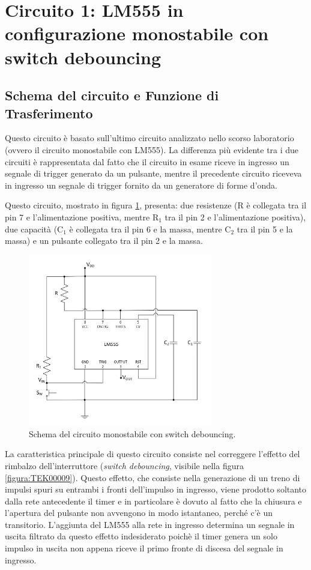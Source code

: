 \documentclass{report}
\begin{document}
\newpage
\section{Circuito 1: LM555 in configurazione monostabile con switch debouncing}
\subsection{Schema del circuito e Funzione di Trasferimento}
Questo circuito è basato sull'ultimo circuito analizzato nello scorso laboratorio (ovvero il circuito monostabile con LM555). La differenza più evidente tra i due circuiti è rappresentata dal fatto che il circuito in esame riceve in ingresso un segnale di trigger generato da un pulsante, mentre il precedente circuito riceveva in ingresso un segnale di trigger fornito da un generatore di forme d'onda.

Questo circuito, mostrato in figura \ref{figura:schema1}, presenta: due resistenze (R è collegata tra il pin 7 e l'alimentazione positiva, mentre $\mathrm{R_1}$ tra il pin 2 e l'alimentazione positiva), due capacità ($\mathrm{C_1}$ è collegata tra il pin 6 e la massa, mentre $\mathrm{C_2}$ tra il pin 5 e la massa) e un pulsante collegato tra il pin 2 e la massa.

\begin{figure}[h!]
	\centering
	\includegraphics[height=7.5cm]{immagini/schema1}
	\caption{Schema del circuito monostabile con switch debouncing.}
	\label{figura:schema1}
\end{figure}

\noindent La caratteristica principale di questo circuito consiste nel correggere l'effetto del rimbalzo dell'interruttore (\textit{switch debouncing}, visibile nella figura \ref{figura:TEK00009}). Questo effetto, che consiste nella generazione di un treno di impulsi spuri su entrambi i fronti dell'impulso in ingresso, viene prodotto soltanto dalla rete antecedente il timer e in particolare è dovuto al fatto che la chiusura e l'apertura del pulsante non avvengono in modo istantaneo, perché c'è un transitorio. L'aggiunta del LM555 alla rete in ingresso determina un segnale in uscita filtrato da questo effetto indesiderato poichè il timer genera un solo impulso in uscita non appena riceve il primo fronte di discesa del segnale in ingresso. %
\end{document}
